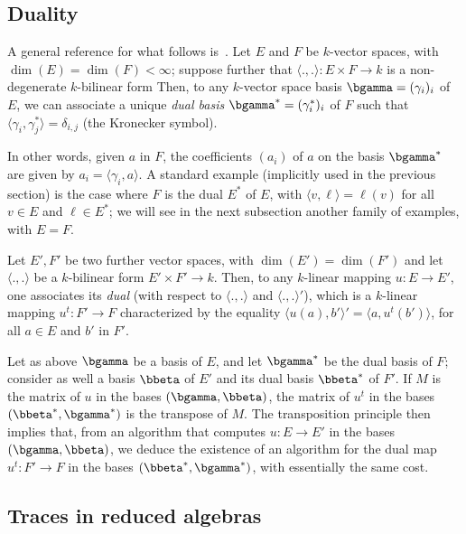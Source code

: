 \documentclass{sig-alternate}
\newcounter{algo}
\newcommand{\ang}[1]{\langle#1\rangle}
\begin{document}

\subsection{Duality}\label{ssec:duality}

A general reference for what follows
is~\cite[Ch.~IX.1.8]{BourbakiAlgCom9}. Let $E$ and $F$ be $k$-vector
spaces, with $\dim(E)=\dim(F) < \infty$; suppose further that
$\ang{.,.}: E\times F \to k$ is a non-degenerate $k$-bilinear form
Then, to any $k$-vector space basis $\bgamma=(\gamma_i)_i$ of $E$, we
can associate a unique \emph{dual basis}
$\bgamma^\ast=(\gamma_i^\ast)_i$ of $F$ such that $
\ang{\gamma_i,\gamma^\ast_j} = \delta_{i,j}$ (the Kronecker symbol).

In other words, given $a$ in $F$, the coefficients $(a_i)$ of $a$ on
the basis $\bgamma^\ast$ are given by $a_i=\ang{\gamma_i, a}$. A
standard example (implicitly used in the previous section) is the case
where $F$ is the dual $E^*$ of $E$, with $\ang{v,\ell}=\ell(v)$ for
all $v\in E$ and $\ell \in E^*$; we will see in the next subsection
another family of examples, with $E=F$.

Let $E',F'$ be two further vector spaces, with $\dim(E')=\dim(F')$ and
let $\ang{.,.}$ be a $k$-bilinear form $E'\times F' \to k$. Then, to
any $k$-linear mapping $u:E\to E'$, one associates its {\em dual}
(with respect to $\ang{.,.}$ and $\ang{.,.}'$), which is a $k$-linear
mapping $u^t: F' \to F$ characterized by the equality
$\ang{u(a),b'}'=\ang{a,u^t(b')}$, for all $a\in E$ and $b'$ in $F'$.

Let as above $\bgamma$ be a basis of $E$, and let $\bgamma^\ast$ be
the dual basis of $F$; consider as well a basis $\bbeta$ of $E'$ and
its dual basis $\bbeta^\ast$ of $F'$. If $M$ is the matrix of $u$ in
the bases $(\bgamma,\bbeta)$, the matrix of $u^t$ in the bases
$(\bbeta^\ast,\bgamma^\ast)$ is the transpose of $M$. The
transposition principle then implies that, from an algorithm that
computes $u: E \to E'$ in the bases $(\bgamma,\bbeta)$, we deduce the
existence of an algorithm for the dual map $u^t: F' \to F$ in the
bases $(\bbeta^\ast,\bgamma^\ast)$, with essentially the same cost.


\subsection{Traces in reduced algebras}
\end{document}
